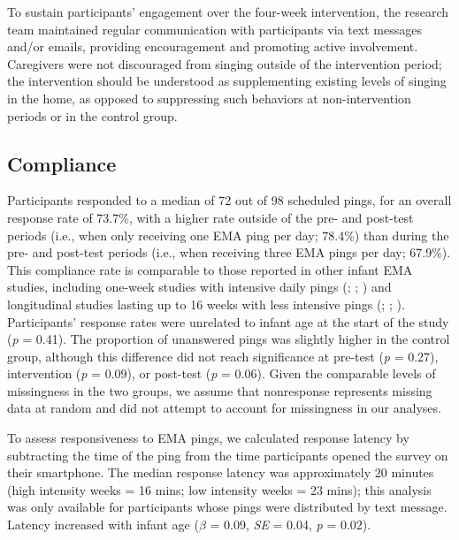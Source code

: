 \documentclass[
]{article}
\begin{document}
To sustain participants' engagement over the four-week intervention, the
research team maintained regular communication with participants via
text messages and/or emails, providing encouragement and promoting
active involvement. Caregivers were not discouraged from singing outside
of the intervention period; the intervention should be understood as
supplementing existing levels of singing in the home, as opposed to
suppressing such behaviors at non-intervention periods or in the control
group.

\subsection{Compliance}\label{compliance}

Participants responded to a median of 72 out of 98 scheduled pings, for
an overall response rate of 73.7\%, with a higher rate outside of the
pre- and post-test periods (i.e., when only receiving one EMA ping per
day; 78.4\%) than during the pre- and post-test periods (i.e., when
receiving three EMA pings per day; 67.9\%). This compliance rate is
comparable to those reported in other infant EMA studies, including
one-week studies with intensive daily pings
(;
;
) and longitudinal studies
lasting up to 16 weeks with less intensive pings
(;
;
). Participants' response
rates were unrelated to infant age at the start of the study (\emph{p} =
0.41). The proportion of unanswered pings was slightly higher in the
control group, although this difference did not reach significance at
pre-test (\emph{p} = 0.27), intervention (\emph{p} = 0.09), or post-test
(\emph{p} = 0.06). Given the comparable levels of missingness in the two
groups, we assume that nonresponse represents missing data at random and
did not attempt to account for missingness in our analyses.

To assess responsiveness to EMA pings, we calculated response latency by
subtracting the time of the ping from the time participants opened the
survey on their smartphone. The median response latency was
approximately 20 minutes (high intensity weeks = 16 mins; low intensity
weeks = 23 mins); this analysis was only available for participants
whose pings were distributed by text message. Latency increased with
infant age (\(\beta\) = 0.09, \emph{SE} = 0.04, \emph{p} = 0.02).
\end{document}
